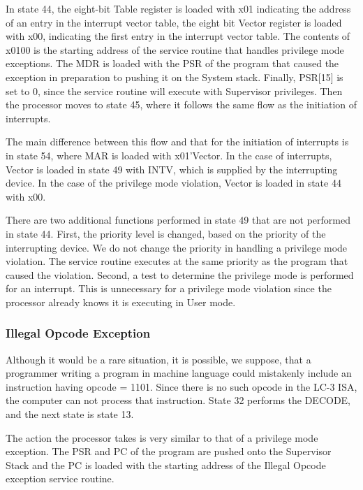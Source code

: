 \documentclass{patt}
\begin{document}
In state 44, the eight-bit Table register is loaded with x01 indicating
the address of an entry in the interrupt vector table, the eight bit Vector
register is loaded with x00, indicating the first entry in the interrupt
vector table.  The contents of x0100 is the starting address of the service
routine that handles privilege mode exceptions.  The MDR is loaded with the 
PSR of the program that caused the exception in preparation to pushing it on
the System stack.  Finally, PSR[15] is set to 0, since the service routine 
will execute with Supervisor privileges.  Then the processor moves to state
45, where it follows the same flow as the initiation of interrupts.

The main difference between this flow and that for the initiation of
interrupts is in state 54, where MAR is loaded with x01'Vector.  In the case 
of interrupts, Vector is loaded in state 49 with INTV, which is supplied by 
the interrupting device.  In the case of the privilege mode violation, 
Vector is loaded in state 44 with x00.

There are two additional functions performed in state 49 that are not 
performed in state 44.  First, the priority level is changed, based on the 
priority of the interrupting device.  We do not change the priority in handling
a privilege mode violation.  The service routine executes at the same priority 
as the program that caused the violation. Second, a test to determine the 
privilege mode is performed for an interrupt.  This is unnecessary for a 
privilege mode violation since the processor already knows it is executing 
in User mode.

\subsubsection{Illegal Opcode Exception}

Although it would be a rare situation, it is possible, we suppose, that
a programmer writing a program in machine language could mistakenly
include an instruction having opcode = 1101.  Since there is no such opcode
in the LC-3 ISA, the computer can not process that instruction.
State 32 performs the DECODE, and the next state is state 13. 

The action the processor takes is very similar to that of a privilege mode 
exception.  The PSR and PC of the program are pushed onto the Supervisor Stack 
and the PC is loaded with the starting address of the Illegal Opcode exception
service routine.  
\end{document}
